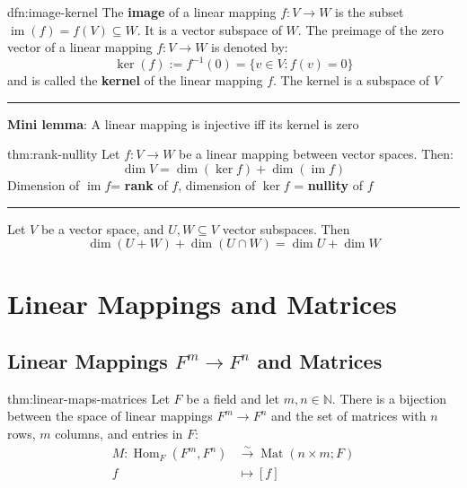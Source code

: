 \documentclass[landscape, 8pt]{extarticle}
\DeclareMathOperator{\im}{im}
\DeclareMathOperator{\Mat}{Mat}
\DeclareMathOperator{\Hom}{Hom}
\begin{document}
\begin{multicols}{3}

\vspace{-5pt}
\begin{dfn}{dfn:image-kernel}{}
    The \textbf{image} of a linear mapping $f : V \to W$ is the subset $\im(f) = f(V) \subseteq W$. It is a vector subspace of $W$. The preimage of the zero vector of a linear mapping $f : V \to W$ is denoted by:
    \[\ker(f) := f^{-1}(0) = \{v\in V : f(v) = 0\}\]
    and is called the \textbf{kernel} of the linear mapping $f$. The kernel is a subspace of $V$

    \noindent\rule{\textwidth}{0.2pt}
    \textbf{Mini lemma}: A linear mapping is injective iff its kernel is zero
\end{dfn}

\begin{thm}{thm:rank-nullity}{}
    Let $f : V \to W$ be a linear mapping between vector spaces. Then:
    \[\dim V = \dim(\ker f) + \dim (\im f)\]
    Dimension of $\im f$= \textbf{rank} of $f$, dimension of $\ker f$ = \textbf{nullity} of $f$

    \noindent\rule{\textwidth}{0.2pt}
    Let $V$ be a vector space, and $U,W\subseteq V$ vector subspaces. Then
    \[\dim(U + W) + \dim(U \cap W) = \dim U + \dim W\]
\end{thm}

\section{Linear Mappings and Matrices}
\subsection{Linear Mappings \texorpdfstring{$F^{m}\to F^{n}$}{Fm to Fn} and Matrices}
\begin{thm}{thm:linear-maps-matrices}{}
    Let $F$ be a field and let $m,n\in \mathbb{N}$. There is a bijection between the space of linear mappings $F^{m}\to F^{n}$ and the set of matrices with $n$ rows, $m$ columns, and entries in $F$:
    \begin{align*}
        M : \Hom_{F}(F^{m}, F^{n}) &\xrightarrow{\sim} \Mat(n \times m; F)\\
        f &\mapsto [f]
    \end{align*}


\end{thm}
\end{multicols}
\end{document}
